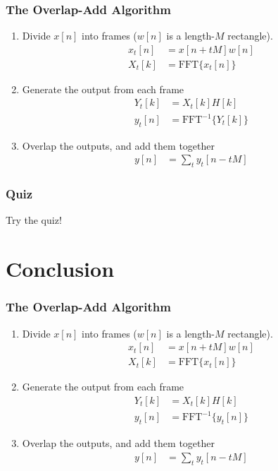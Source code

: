 \documentclass{beamer}
\begin{document}
\begin{frame}
  \frametitle{The Overlap-Add Algorithm}

  \begin{enumerate}
    \item Divide $x[n]$ into frames ($w[n]$ is a length-$M$ rectangle).
      \begin{align*}
        x_t[n] &= x[n+tM]w[n]\\
        X_t[k] &= \text{FFT}\{x_t[n]\}
      \end{align*}
    \item Generate the output from each frame
      \begin{align*}
        Y_t[k] &= X_t[k]H[k]\\
        y_t[n] &= \text{FFT}^{-1}\{Y_t[k]\}
      \end{align*}
    \item  Overlap the outputs, and add them together
      \begin{align*}
        y[n] &= \sum_t y_t[n-tM]
      \end{align*}
  \end{enumerate}
\end{frame}

\begin{frame}
  \frametitle{Quiz}
  Try the quiz!
\end{frame}

\section[Conclusion]{Conclusion}
\setcounter{subsection}{1}

\begin{frame}
  \frametitle{The Overlap-Add Algorithm}

  \begin{enumerate}
    \item Divide $x[n]$ into frames ($w[n]$ is a length-$M$ rectangle).
      \begin{align*}
        x_t[n] &= x[n+tM]w[n]\\
        X_t[k] &= \text{FFT}\{x_t[n]\}
      \end{align*}
    \item Generate the output from each frame
      \begin{align*}
        Y_t[k] &= X_t[k]H[k]\\
        y_t[n] &= \text{FFT}^{-1}\{y_t[n]\}
      \end{align*}
    \item  Overlap the outputs, and add them together
      \begin{align*}
        y[n] &= \sum_t y_t[n-tM]
      \end{align*}
  \end{enumerate}
\end{frame}
\end{document}
